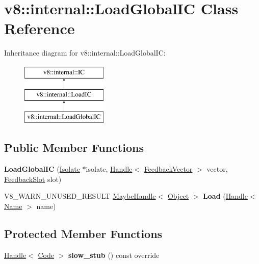 \hypertarget{classv8_1_1internal_1_1LoadGlobalIC}{}\section{v8\+:\+:internal\+:\+:Load\+Global\+IC Class Reference}
\label{classv8_1_1internal_1_1LoadGlobalIC}
Inheritance diagram for v8\+:\+:internal\+:\+:Load\+Global\+IC\+:\begin{figure}[H]
\begin{center}
\leavevmode
\includegraphics[height=3.000000cm]{classv8_1_1internal_1_1LoadGlobalIC}
\end{center}
\end{figure}
\subsection*{Public Member Functions}
\begin{DoxyCompactItemize}
\item 
\mbox{\label{classv8_1_1internal_1_1LoadGlobalIC_aefbf81c748c6fa06a01b0d61e372eeb7}} 
{\bfseries Load\+Global\+IC} (\mbox{\hyperlink{classv8_1_1internal_1_1Isolate}{Isolate}} $\ast$isolate, \mbox{\hyperlink{classv8_1_1internal_1_1Handle}{Handle}}$<$ \mbox{\hyperlink{classv8_1_1internal_1_1FeedbackVector}{Feedback\+Vector}} $>$ vector, \mbox{\hyperlink{classv8_1_1internal_1_1FeedbackSlot}{Feedback\+Slot}} slot)
\item 
\mbox{\label{classv8_1_1internal_1_1LoadGlobalIC_a056e49c94c8c1803e9dac2030a967d29}} 
V8\+\_\+\+W\+A\+R\+N\+\_\+\+U\+N\+U\+S\+E\+D\+\_\+\+R\+E\+S\+U\+LT \mbox{\hyperlink{classv8_1_1internal_1_1MaybeHandle}{Maybe\+Handle}}$<$ \mbox{\hyperlink{classv8_1_1internal_1_1Object}{Object}} $>$ {\bfseries Load} (\mbox{\hyperlink{classv8_1_1internal_1_1Handle}{Handle}}$<$ \mbox{\hyperlink{classv8_1_1internal_1_1Name}{Name}} $>$ name)
\end{DoxyCompactItemize}
\subsection*{Protected Member Functions}
\begin{DoxyCompactItemize}
\item 
\mbox{\label{classv8_1_1internal_1_1LoadGlobalIC_a595e5eb92052d23596d67cd8331530b0}} 
\mbox{\hyperlink{classv8_1_1internal_1_1Handle}{Handle}}$<$ \mbox{\hyperlink{classv8_1_1internal_1_1Code}{Code}} $>$ {\bfseries slow\+\_\+stub} () const override
\end{DoxyCompactItemize}
